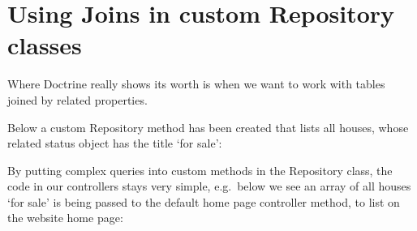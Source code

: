 \documentclass[a4paperpaper,openright]{book}
\newenvironment{Shaded}{}{}
\newcommand{\FunctionTok}[1]{\textcolor[rgb]{0.02,0.16,0.49}{#1}}
\newcommand{\KeywordTok}[1]{\textcolor[rgb]{0.00,0.44,0.13}{\textbf{#1}}}
\newcommand{\NormalTok}[1]{#1}
\newcommand{\OtherTok}[1]{\textcolor[rgb]{0.00,0.44,0.13}{#1}}
\newcommand{\StringTok}[1]{\textcolor[rgb]{0.25,0.44,0.63}{#1}}
\begin{document}
\hypertarget{using-joins-in-custom-repository-classes}{%
\section{Using Joins in custom Repository
classes}\label{using-joins-in-custom-repository-classes}}

Where Doctrine really shows its worth is when we want to work with
tables joined by related properties.

Below a custom Repository method has been created that lists all houses,
whose related status object has the title `for sale':

\begin{Shaded}
\end{Shaded}

By putting complex queries into custom methods in the Repository class,
the code in our controllers stays very simple, e.g.~below we see an
array of all houses `for sale' is being passed to the default home page
controller method, to list on the website home page:
\end{document}
